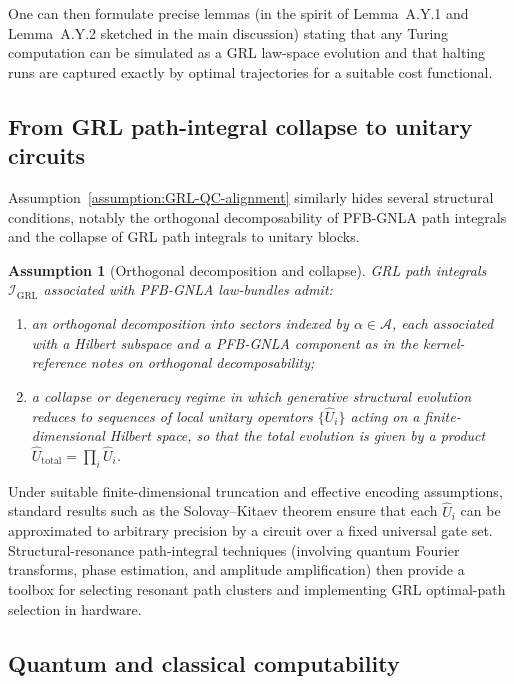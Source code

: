 \documentclass[11pt]{book}
\theoremstyle{plain}
\newtheorem{assumption}[theorem]{Assumption}
\theoremstyle{definition}
\theoremstyle{remark}
\begin{document}
One can then formulate precise lemmas (in the spirit of
Lemma~A.Y.1 and Lemma~A.Y.2 sketched in the main discussion) stating
that any Turing computation can be simulated as a GRL law-space
evolution and that halting runs are captured exactly by optimal
trajectories for a suitable cost functional.

\subsection{From GRL path-integral collapse to unitary circuits}

Assumption~\ref{assumption:GRL-QC-alignment} similarly hides several
structural conditions, notably the orthogonal decomposability of
PFB-GNLA path integrals and the collapse of GRL path integrals to
unitary blocks.

\begin{assumption}[Orthogonal decomposition and collapse]
GRL path integrals $\mathcal{I}_{\mathrm{GRL}}$ associated with
PFB-GNLA law-bundles admit:
\begin{enumerate}[label=(\roman*)]
  \item an orthogonal decomposition into sectors indexed by
        $\alpha\in\mathcal{A}$, each associated with a Hilbert
        subspace and a PFB-GNLA component as in the kernel-reference
        notes on orthogonal decomposability;
  \item a collapse or degeneracy regime in which generative structural
        evolution reduces to sequences of local unitary operators
        $\{\hat U_i\}$ acting on a finite-dimensional Hilbert space,
        so that the total evolution is given by a product
        $\hat U_{\mathrm{total}} = \prod_i \hat U_i$.
\end{enumerate}
\end{assumption}

Under suitable finite-dimensional truncation and effective encoding
assumptions, standard results such as the Solovay--Kitaev theorem
ensure that each $\hat U_i$ can be approximated to arbitrary precision
by a circuit over a fixed universal gate set. Structural-resonance
path-integral techniques (involving quantum Fourier transforms, phase
estimation, and amplitude amplification) then provide a toolbox for
selecting resonant path clusters and implementing GRL optimal-path
selection in hardware.

\subsection{Quantum and classical computability}
\end{document}
